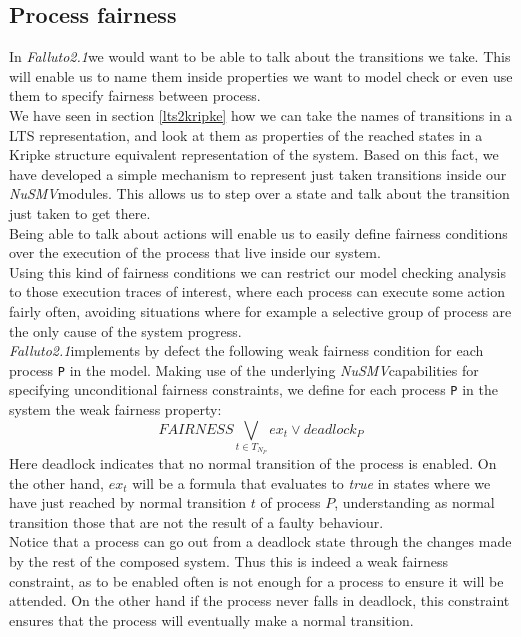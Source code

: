 \documentclass[12pt]{article}
\newcommand{\nusmv}{\mbox{\textit{NuSMV}}}
\newcommand{\falluto}{\mbox{\textit{Falluto2.1}}}
\begin{document}
\subsection{Process fairness}\label{process fairness}
In \falluto we would want to be able to talk about the transitions we take. This will enable us to name them inside properties we want to model check or even use them to specify fairness between process.\\
We have seen in section \ref{lts2kripke} how we can take the names of transitions in a LTS representation, and look at them as properties of the reached states in a Kripke structure equivalent representation of the system. Based on this fact, we have developed a simple mechanism to represent just taken transitions inside our \nusmv modules. This allows us to step over a state and talk about the transition just taken to get there.\\
Being able to talk about actions will enable us to easily define fairness
conditions over the execution of the process that live inside our system.\\
Using this kind of fairness conditions we can restrict our model
checking analysis to those execution traces of interest, where each process
can execute some action fairly often, avoiding situations where for example a
selective group of process are the only cause of the system progress.\\        %
\falluto implements by defect the following weak fairness
condition for each process \texttt{P} in the model. Making use of the
underlying \nusmv capabilities for specifying unconditional
fairness constraints, we define for each process \texttt{P} in the system the
weak fairness property:
$$FAIRNESS \bigvee_{t \in T_{N_{P}}} ex_t \vee deadlock_P$$
Here deadlock indicates that no normal transition of the process is enabled. On the other hand, $ex_t$ will be a formula that evaluates to \textit{true} in states where we have just reached by normal transition $t$ of process $P$, understanding as normal transition those that are not the result of a faulty behaviour.\\
Notice that a process can go out from a deadlock state through the
changes made by the rest of the composed system. Thus this is
indeed a weak fairness constraint, as to be enabled often is not enough for a
process to ensure it will be attended. On the other hand if the process never
falls in deadlock, this constraint ensures that the process will eventually
make a normal transition.
\end{document}
